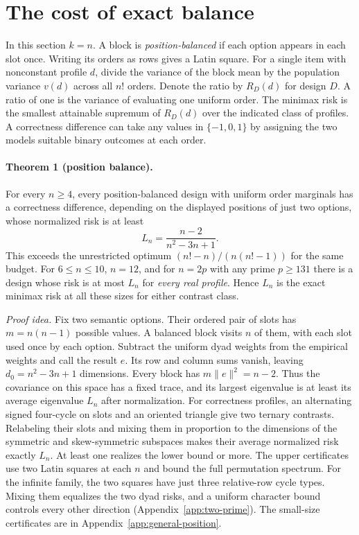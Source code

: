 \section{The cost of exact balance}
\label{sec:theory}
In this section $k=n$. A block is \emph{position-balanced} if each option appears in each slot
once. Writing its orders as rows gives a Latin square. For a single item
with nonconstant profile $d$, divide the variance of the block mean
by the population variance $v(d)$ across all $n!$ orders. Denote the
ratio by $R_D(d)$ for design $D$. A ratio of one is the variance of
evaluating one uniform order. The minimax risk is the smallest attainable
supremum of $R_D(d)$ over the indicated class of profiles. A correctness
difference can take any values in $\{-1,0,1\}$ by assigning the two
models suitable binary outcomes at each order.

\paragraph{Theorem 1 (position balance).}
For every $n\ge4$, every position-balanced design with uniform order
marginals has a correctness difference, depending on the displayed
positions of just two options, whose normalized risk is at least
\begin{equation}
 L_n=\frac{n-2}{n^2-3n+1}.
 \label{eq:two-option}
\end{equation}
This exceeds the unrestricted optimum $(n!-n)/(n(n!-1))$ for the same
budget. For $6\le n\le10$, $n=12$, and for $n=2p$ with any prime $p\ge131$ there is a design whose risk is at most
$L_n$ for \emph{every real profile}. Hence $L_n$ is the exact minimax
risk at all these sizes for either contrast class.

\emph{Proof idea.} Fix two semantic options. Their ordered pair of slots
has $m=n(n-1)$ possible values. A balanced block visits $n$ of them,
with each slot used once by each option. Subtract the uniform dyad
weights from the empirical weights and call the result $e$.
Its row and column sums vanish, leaving $d_0=n^2-3n+1$ dimensions.
Every block has $m\|e\|^2=n-2$. Thus the covariance on this space has
a fixed trace, and its largest eigenvalue is at least its average
eigenvalue $L_n$ after normalization. For correctness profiles,
an alternating signed four-cycle on slots and an oriented triangle
give two ternary contrasts. Relabeling their slots and mixing them
in proportion to the dimensions of the symmetric and skew-symmetric
subspaces makes their average normalized risk exactly $L_n$.
At least one realizes the lower bound or more. The upper certificates
use two Latin squares at each $n$ and bound the full permutation
spectrum. For the infinite family, the two squares have just three relative-row cycle types. Mixing them equalizes the two dyad risks, and a uniform character bound controls every other direction (Appendix~\ref{app:two-prime}). The small-size certificates are in Appendix~\ref{app:general-position}.

